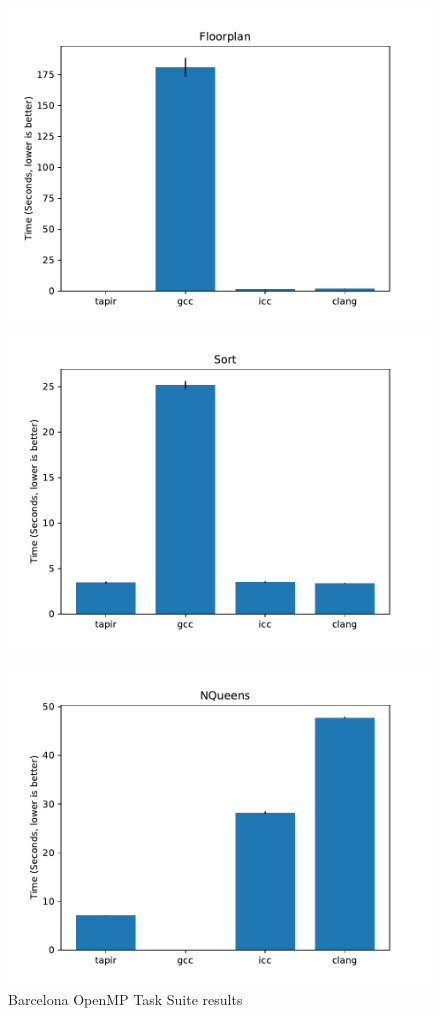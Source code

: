 \documentclass[sigconf]{acmart}
\begin{document}
\begin{figure}
\begin{multicols}{2}
  \includegraphics[width=\linewidth]{floorplan.pdf} 
  \includegraphics[width=\linewidth]{sort.pdf} \par
  \includegraphics[width=\linewidth]{nqueens.pdf}
\end{multicols}
\caption{Barcelona OpenMP Task Suite results}
\label{fig:results}
\end{figure}
\end{document}

